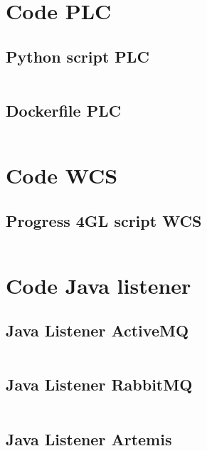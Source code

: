 
\section{Code PLC}\label{sec:code_plc}

\subsection{Python script PLC} \label{sec:script_plc}
\inputminted{python3}{../tests/plc/plc-simulator.py}\label{listing:script_plc}

\subsection{Dockerfile PLC} \label{sec:docker_plc}
\inputminted{python3}{../tests/plc/Dockerfile} \label{listing:docker_plc}


\section{Code WCS}\label{sec:code_wcs}

\subsection{Progress 4GL script WCS} \label{sec:script_wcs}
\inputminted{python3}{../tests/wcs/wcs.p} \label{listing:script_wcs}

\section{Code Java listener}\label{sec:code_java_listener} 
\subsection{Java Listener ActiveMQ}\label{sec:listener_activemq}
\inputminted{python3}{../tests/listener/activemq-listener/demo/src/main/java/com/example/ActiveMQSocketBridge.java}\label{listing:listener_activemq}
\subsection{Java Listener RabbitMQ}\label{sec:listener_rabbitmq}
\inputminted{python3}{../tests/listener/rabbitmq-listener/rabbitmq-plc-listener/src/main/java/com/listener/RabbitMQSocketBridge.java}\label{listing:listener_rabbitmq}
\subsection{Java Listener Artemis}\label{sec:listener_artemis}
\inputminted{python3}{../tests/listener/artemis-listener/demo/src/main/java/com/example/ArtemisSocketBridge.java}\label{listing:listener_artemis}


